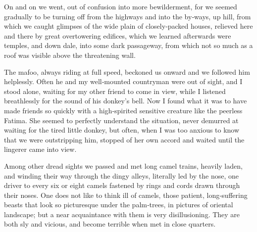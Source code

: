 \documentclass[12pt]{book}
\begin{document}
On and on we went, out of confusion into more bewilderment, for we seemed
gradually to be turning off from the highways and into the by‐ways, up hill, from
which we caught glimpses of the wide plain of closely‐packed houses, relieved
here and there by great overtowering edifices, which we learned afterwards were
temples, and down dale, into some dark passageway, from which not so much as
a roof was visible above the threatening wall.

The mafoo, always riding at full speed, beckoned us onward and we followed
him helplessly. Often he and my well‐mounted countryman were out of sight,
and I stood alone, waiting for my other friend to come in view, while I listened
breathlessly for the sound of his donkey’s bell. Now I found what it was to have
made friends so quickly with a high‐spirited sensitive creature like the peerless
Fatima. She seemed to perfectly understand the situation, never demurred at
waiting for the tired little donkey, but often, when I was too anxious to know
that we were outstripping him, stopped of her own accord and waited until the
lingerer came into view.

Among other dread sights we passed and met long camel trains, heavily laden,
and winding their way through the dingy alleys, literally led by the nose, one
driver to every six or eight camels fastened by rings and cords drawn through their
noses. One does not like to think ill of camels, those patient, long‐suffering beasts
that look so picturesque under the palm‐trees, in pictures of oriental landscape;
but a near acquaintance with them is very disillusioning. They are both sly and
vicious, and become terrible when met in close quarters.
\end{document}

